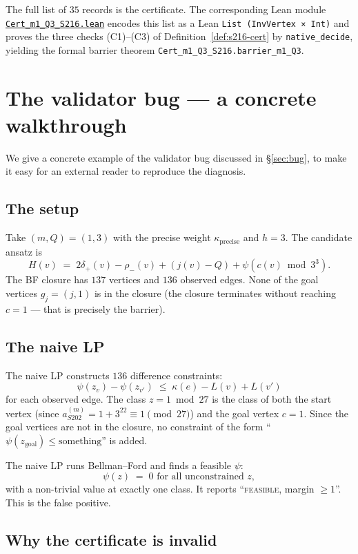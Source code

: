 \documentclass[11pt,a4paper]{article}
\theoremstyle{plain}
\theoremstyle{definition}
\newcommand{\aSat}{a_{S202}^{(m)}}
\begin{document}
The full list of $35$ records is the certificate. The corresponding
Lean module
\href{run:CollatzLean4/CollatzLean4/Cert_m1_Q3_S216.lean}%
{\texttt{Cert\_m1\_Q3\_S216.lean}}
encodes this list as a Lean \texttt{List (InvVertex × Int)} and
proves the three checks (C1)--(C3) of
Definition~\ref{def:s216-cert} by \texttt{native\_decide}, yielding
the formal barrier theorem
\texttt{Cert\_m1\_Q3\_S216.barrier\_m1\_Q3}.

\section{The validator bug — a concrete walkthrough}\label{app:bug}

We give a concrete example of the validator bug discussed in
\S\ref{sec:bug}, to make it easy for an external reader to
reproduce the diagnosis.

\subsection{The setup}

Take $(m, Q) = (1, 3)$ with the precise weight
$\kappa_{\mathrm{precise}}$ and $h = 3$. The candidate ansatz is
\[
  H(v) \;=\; 2 \delta_+(v) - \rho_-(v) + (j(v) - Q) + \psi(c(v) \bmod 3^3).
\]
The BF closure has $137$ vertices and $136$ observed edges. None of
the goal vertices $g_j = (j, 1)$ is in the closure (the closure
terminates without reaching $c = 1$ — that is precisely the barrier).

\subsection{The naive LP}

The naive LP constructs $136$ difference constraints:
\[
   \psi(z_v) - \psi(z_{v'}) \;\le\; \kappa(e) - L(v) + L(v')
\]
for each observed edge. The class $z = 1 \bmod 27$ is the class of
both the start vertex (since $\aSat = 1 + 3^{22} \equiv 1 \pmod{27}$)
and the goal vertex $c = 1$. Since the goal vertices are not in
the closure, no constraint of the form
``$\psi(z_{\text{goal}}) \le \text{something}$'' is added.

The naive LP runs Bellman--Ford and finds a feasible $\psi$:
\[
  \psi(z) \;=\; 0 \text{ for all unconstrained } z,
\]
with a non-trivial value at exactly one class. It reports
``\textsc{feasible}, margin $\ge 1$''. This is the false positive.

\subsection{Why the certificate is invalid}
\end{document}
